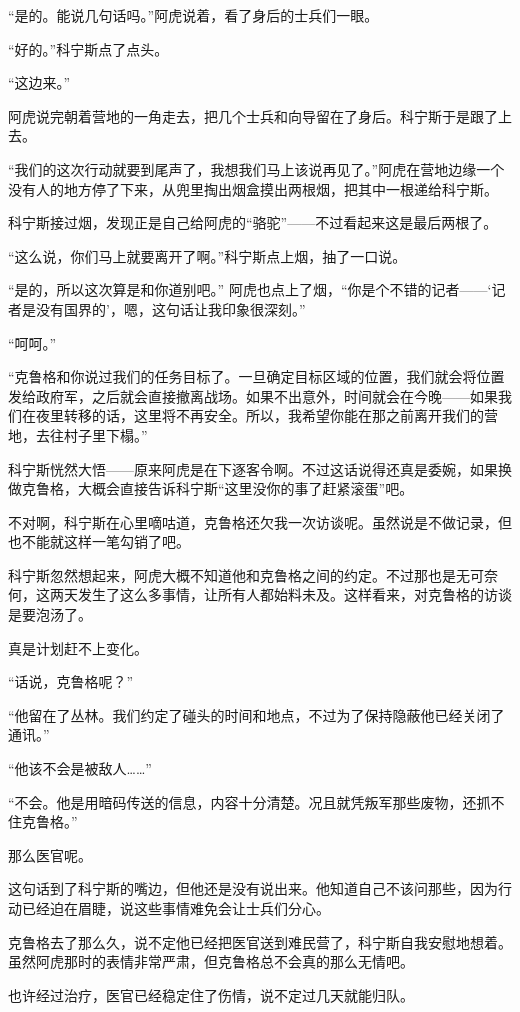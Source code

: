 “是的。能说几句话吗。”阿虎说着，看了身后的士兵们一眼。

“好的。”科宁斯点了点头。

“这边来。”

阿虎说完朝着营地的一角走去，把几个士兵和向导留在了身后。科宁斯于是跟了上去。

“我们的这次行动就要到尾声了，我想我们马上该说再见了。”阿虎在营地边缘一个没有人的地方停了下来，从兜里掏出烟盒摸出两根烟，把其中一根递给科宁斯。

科宁斯接过烟，发现正是自己给阿虎的“骆驼”——不过看起来这是最后两根了。

“这么说，你们马上就要离开了啊。”科宁斯点上烟，抽了一口说。

“是的，所以这次算是和你道别吧。” 阿虎也点上了烟，“你是个不错的记者——‘记者是没有国界的’，嗯，这句话让我印象很深刻。”

“呵呵。”

“克鲁格和你说过我们的任务目标了。一旦确定目标区域的位置，我们就会将位置发给政府军，之后就会直接撤离战场。如果不出意外，时间就会在今晚——如果我们在夜里转移的话，这里将不再安全。所以，我希望你能在那之前离开我们的营地，去往村子里下榻。”

科宁斯恍然大悟——原来阿虎是在下逐客令啊。不过这话说得还真是委婉，如果换做克鲁格，大概会直接告诉科宁斯“这里没你的事了赶紧滚蛋”吧。

不对啊，科宁斯在心里嘀咕道，克鲁格还欠我一次访谈呢。虽然说是不做记录，但也不能就这样一笔勾销了吧。

科宁斯忽然想起来，阿虎大概不知道他和克鲁格之间的约定。不过那也是无可奈何，这两天发生了这么多事情，让所有人都始料未及。这样看来，对克鲁格的访谈是要泡汤了。

真是计划赶不上变化。

“话说，克鲁格呢？”

“他留在了丛林。我们约定了碰头的时间和地点，不过为了保持隐蔽他已经关闭了通讯。”

“他该不会是被敌人……”

“不会。他是用暗码传送的信息，内容十分清楚。况且就凭叛军那些废物，还抓不住克鲁格。”

那么医官呢。

这句话到了科宁斯的嘴边，但他还是没有说出来。他知道自己不该问那些，因为行动已经迫在眉睫，说这些事情难免会让士兵们分心。

克鲁格去了那么久，说不定他已经把医官送到难民营了，科宁斯自我安慰地想着。虽然阿虎那时的表情非常严肃，但克鲁格总不会真的那么无情吧。

也许经过治疗，医官已经稳定住了伤情，说不定过几天就能归队。

